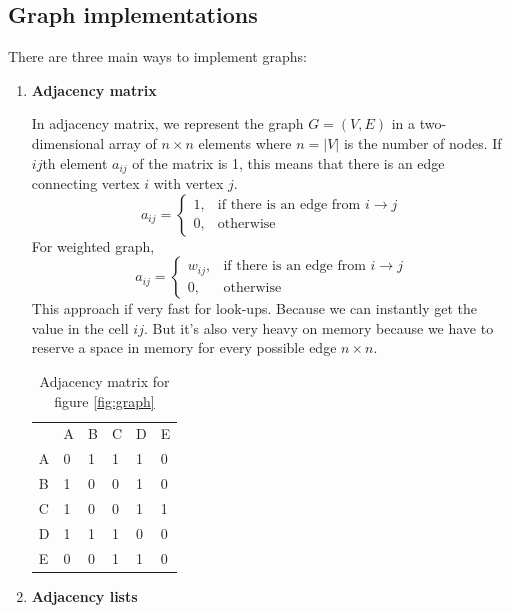 \documentclass[a4paper,11pt]{book}
\begin{document}
\subsection{Graph implementations}

\noindent There are three main ways to implement graphs:
\begin{enumerate}
    \item \textbf{Adjacency matrix}
    
    \noindent In adjacency matrix, we represent the graph $G = (V,E)$ in a two-dimensional array of $n \times n$ elements where $n = |V|$ is the number of nodes. If $ij$th element $a_{ij}$ of the matrix is 1, this means that there is an edge connecting vertex $i$ with vertex $j$. 
    \[
    a_{ij}= 
\begin{cases}
    1,& \text{if there is an edge from } i \rightarrow  j\\
    0,              & \text{otherwise}
\end{cases}
\]
    For weighted graph,
    \[
    a_{ij}= 
\begin{cases}
    w_{ij},& \text{if there is an edge from } i \rightarrow  j\\
    0,              & \text{otherwise}
\end{cases}
\]
    This approach if very fast for look-ups. Because we can instantly get the value in the cell $ij$. But it's also very heavy on memory because we have to reserve a space in memory for every possible edge $n \times n$.
    \begin{table}[ht]
    \centering
\begin{tabular}{llllll}
\multicolumn{1}{c}{}   & \multicolumn{1}{c}{A}  & \multicolumn{1}{c}{B}  & C                      & D                      & E                      \\ \cline{2-6} 
\multicolumn{1}{l|}{A} & \multicolumn{1}{l|}{0} & \multicolumn{1}{l|}{1} & \multicolumn{1}{l|}{1} & \multicolumn{1}{l|}{1} & \multicolumn{1}{l|}{0} \\ \cline{2-6} 
\multicolumn{1}{l|}{B} & \multicolumn{1}{l|}{1} & \multicolumn{1}{l|}{0} & \multicolumn{1}{l|}{0} & \multicolumn{1}{l|}{1} & \multicolumn{1}{l|}{0} \\ \cline{2-6} 
\multicolumn{1}{l|}{C} & \multicolumn{1}{l|}{1} & \multicolumn{1}{l|}{0} & \multicolumn{1}{l|}{0} & \multicolumn{1}{l|}{1} & \multicolumn{1}{l|}{1} \\ \cline{2-6} 
\multicolumn{1}{l|}{D} & \multicolumn{1}{l|}{1} & \multicolumn{1}{l|}{1} & \multicolumn{1}{l|}{1} & \multicolumn{1}{l|}{0} & \multicolumn{1}{l|}{0} \\ \cline{2-6} 
\multicolumn{1}{l|}{E} & \multicolumn{1}{l|}{0} & \multicolumn{1}{l|}{0} & \multicolumn{1}{l|}{1} & \multicolumn{1}{l|}{1} & \multicolumn{1}{l|}{0} \\ \cline{2-6} 
\end{tabular}
\caption{Adjacency matrix for figure \ref{fig:graph}}
\end{table}
    \item \textbf{Adjacency lists}
    

\end{enumerate}
\end{document}
